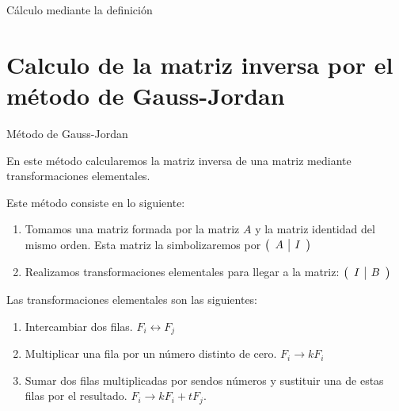 \documentclass[9pt,aspectratio=159]{beamer}
\begin{document}
\begin{frame}{Cálculo mediante la definición}
\end{frame}

\section{Calculo de la matriz inversa por el método de Gauss-Jordan}

\begin{frame}{Método de Gauss-Jordan}


En este método calcularemos la matriz inversa de una matriz mediante transformaciones elementales.

\pause

Este método consiste en lo siguiente:
\pause
\begin{enumerate}[<+-|alert@+>]
\item Tomamos una matriz formada por la matriz $A$ y la matriz identidad del mismo orden. Esta matriz la simbolizaremos por $\left( \begin{array}{c | c}
A &  I 
\end{array} \right) $
\item Realizamos transformaciones elementales para llegar a la matriz: $\left( \begin{array}{c | c} I & B 
\end{array} \right) $
\end{enumerate}

\pause
Las transformaciones elementales son las siguientes:
\pause
\begin{enumerate}[<+-|alert@+>]
\item Intercambiar dos filas. $F_i \leftrightarrow F_j$
\item Multiplicar una fila por un número distinto de cero. $F_i \rightarrow kF_i$
\item Sumar dos filas multiplicadas por sendos números y sustituir una de estas filas por el resultado. $F_i \rightarrow kF_i+tF_j$.
\end{enumerate}

\end{frame}
\end{document}
